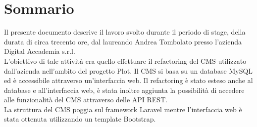 
\cleardoublepage
{}
{}
\begingroup
\let\clearpage\relax
\let\cleardoublepage\relax
\let\cleardoublepage\relax

\chapter*{Sommario}

Il presente documento descrive il lavoro svolto durante il periodo di stage, della durata di circa trecento ore, dal laureando Andrea Tombolato presso l'azienda Digital Accademia s.r.l. \\
L'obiettivo di tale attività era quello effettuare il refactoring del CMS utilizzato dall'azienda nell'ambito del progetto Plot. Il CMS si basa su un database MySQL ed è accessibile attraverso un'interfaccia web. Il refactoring è stato esteso anche al database e all'interfaccia web, è stata inoltre aggiunta la possibilità di accedere alle funzionalità del CMS attraverso delle API REST. \\
La struttura del CMS poggia sul framework Laravel mentre l'interfaccia web è stata ottenuta utilizzando un template Bootstrap.



%
%

\endgroup			

\vfill

